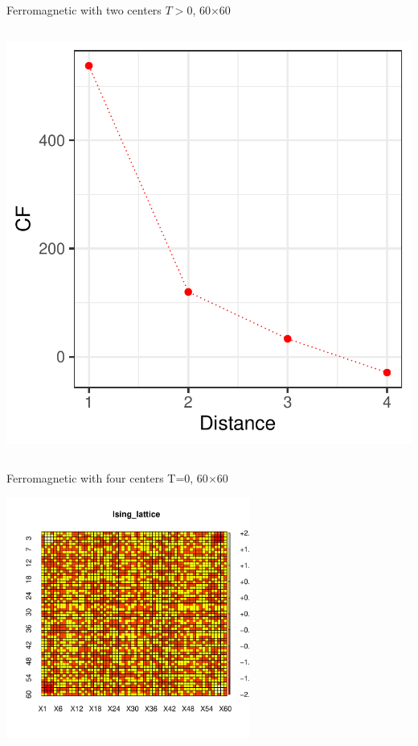 \documentclass{beamer}
\begin{document}
\begin{frame}{Ferromagnetic with two centers $T>0$,  60$\times$60}
\begin{columns}
\begin{column}{0.3\textwidth}
\begin{center}
     \end{center}
         \begin{center}
     \includegraphics[width=\textwidth]{Pic/J+1_60_10000_T=8_COHERENCE.pdf}
     \end{center}
\end{column}
\end{columns}
\end{frame}


\begin{frame}{Ferromagnetic with four centers T=0,  60$\times$60}
    \begin{center}
     \includegraphics[width=0.6\textwidth]{Pic/J+1_60_10000_four_center_T=0_START.pdf}
     \end{center}
\end{frame}
\end{document}
